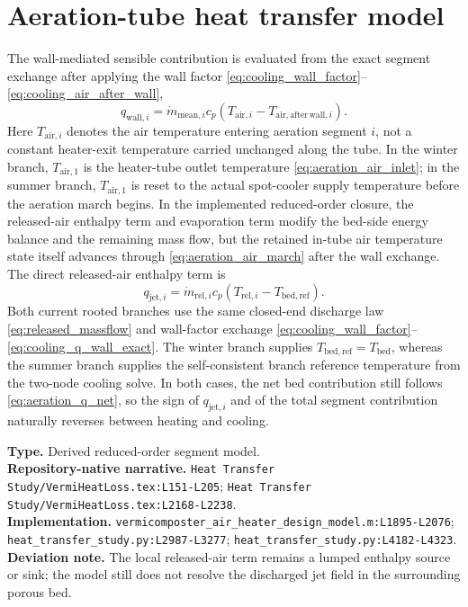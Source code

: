 \documentclass[11pt]{article}
\newcommand{\srcref}[1]{\nolinkurl{#1}}
\newcommand{\filepath}[1]{\nolinkurl{#1}}
\begin{document}
\section{Aeration-tube heat transfer model}
The wall-mediated sensible contribution is evaluated from the exact segment exchange after applying the wall factor \eqref{eq:cooling_wall_factor}--\eqref{eq:cooling_air_after_wall},
\begin{equation}
\label{eq:aeration_q_wall}
q_{\mathrm{wall},i}=\dot m_{\mathrm{mean},i}c_p\left(T_{\mathrm{air},i}-T_{\mathrm{air,after\,wall},i}\right).
\end{equation}
Here \(T_{\mathrm{air},i}\) denotes the air temperature entering aeration segment \(i\), not a constant heater-exit temperature carried unchanged along the tube. In the winter branch, \(T_{\mathrm{air},1}\) is the heater-tube outlet temperature \eqref{eq:aeration_air_inlet}; in the summer branch, \(T_{\mathrm{air},1}\) is reset to the actual spot-cooler supply temperature before the aeration march begins. In the implemented reduced-order closure, the released-air enthalpy term and evaporation term modify the bed-side energy balance and the remaining mass flow, but the retained in-tube air temperature state itself advances through \eqref{eq:aeration_air_march} after the wall exchange.
The direct released-air enthalpy term is
\begin{equation}
\label{eq:aeration_q_jet}
q_{\mathrm{jet},i}=\dot m_{\mathrm{rel},i}c_p\left(T_{\mathrm{rel},i}-T_{\mathrm{bed,ref}}\right).
\end{equation}
Both current rooted branches use the same closed-end discharge law \eqref{eq:released_massflow} and wall-factor exchange \eqref{eq:cooling_wall_factor}--\eqref{eq:cooling_q_wall_exact}. The winter branch supplies \(T_{\mathrm{bed,ref}}=T_{\mathrm{bed}}\), whereas the summer branch supplies the self-consistent branch reference temperature from the two-node cooling solve. In both cases, the net bed contribution still follows \eqref{eq:aeration_q_net}, so the sign of \(q_{\mathrm{jet},i}\) and of the total segment contribution naturally reverses between heating and cooling.

\textbf{Type.} Derived reduced-order segment model. \\
\textbf{Repository-native narrative.} \filepath{Heat Transfer Study/VermiHeatLoss.tex:L151-L205}; \filepath{Heat Transfer Study/VermiHeatLoss.tex:L2168-L2238}. \\
\textbf{Implementation.} \srcref{vermicomposter_air_heater_design_model.m:L1895-L2076}; \srcref{heat_transfer_study.py:L2987-L3277}; \srcref{heat_transfer_study.py:L4182-L4323}. \\
\textbf{Deviation note.} The local released-air term remains a lumped enthalpy source or sink; the model still does not resolve the discharged jet field in the surrounding porous bed.
\end{document}

